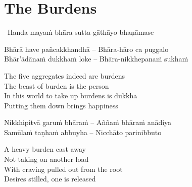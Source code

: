 \suttaRef{[Dhp 85-87.5]}


\section{The Burdens}
\label{burdens}

\begin{leader}
  \anglebracketleft\ \hspace{-0.5mm}Handa mayaṁ bhāra-sutta-gāthāyo bhaṇāmase \hspace{-0.5mm}\anglebracketright\
\end{leader}

\begin{verses}
  Bhārā have pañcakkhandhā – Bhāra-hāro ca puggalo\\
  Bhār'ādānaṁ dukkhaṁ loke – Bhāra-nikkhepanaṁ sukhaṁ
\end{verses}

\begin{english-verses}
  The five aggregates indeed are burdens\\
  The beast of burden is the person\hyperlink{endnote39-appendix}{\hypertarget{endnote39-body}{}}\\
  In this world to take up burdens is dukkha\\
  Putting them down brings happiness
\end{english-verses}

\begin{verses}
  Nikkhipitvā garuṁ bhāraṁ – Aññaṁ bhāraṁ anādiya\\
  Samūlaṁ taṇhaṁ abbuyha – Nicchāto parinibbuto
\end{verses}

\begin{english-verses}
  A heavy burden cast away\\
  Not taking on another load\\
  With craving pulled out from the root\\
  Desires stilled, one is released
\end{english-verses}

